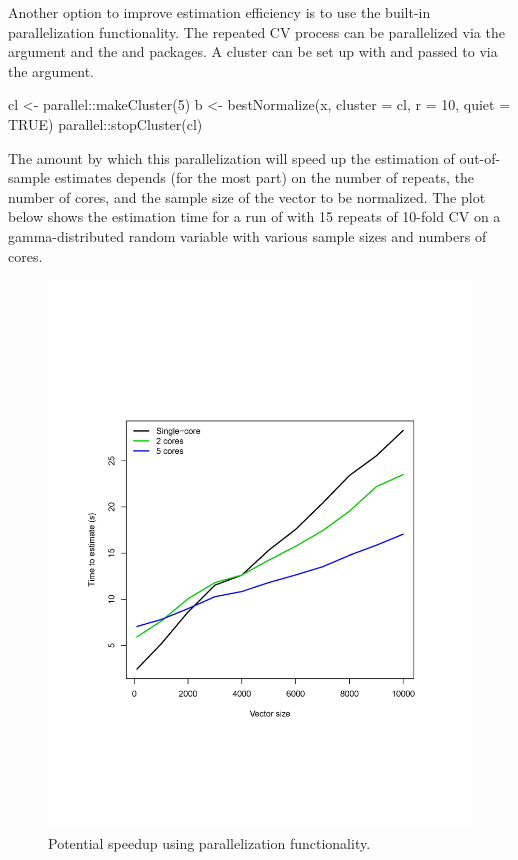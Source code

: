 Another option to improve estimation efficiency is to use the built-in
parallelization functionality. The repeated CV process can be
parallelized via the  argument and the 
and  \citep{doRNG} packages. A cluster can be set up with
 and passed to  via the
 argument.

\begin{Schunk}
\begin{Sinput}
cl <- parallel::makeCluster(5)
b <- bestNormalize(x, cluster = cl, r = 10, quiet = TRUE)
parallel::stopCluster(cl)
\end{Sinput}
\end{Schunk}

The amount by which this parallelization will speed up the estimation of
out-of-sample estimates depends (for the most part) on the number of
repeats, the number of cores, and the sample size of the vector to be
normalized. The plot below shows the estimation time for a run of
 with 15 repeats of 10-fold CV on a
gamma-distributed random variable with various sample sizes and numbers
of cores.

\begin{Schunk}
\begin{figure}

{\centering \includegraphics[width=1\linewidth]{figs/parallel_timings} 

}

\caption[Potential speedup using parallelization functionality]{Potential speedup using parallelization functionality.}\label{fig:paralleltimings}
\end{figure}
\end{Schunk}


